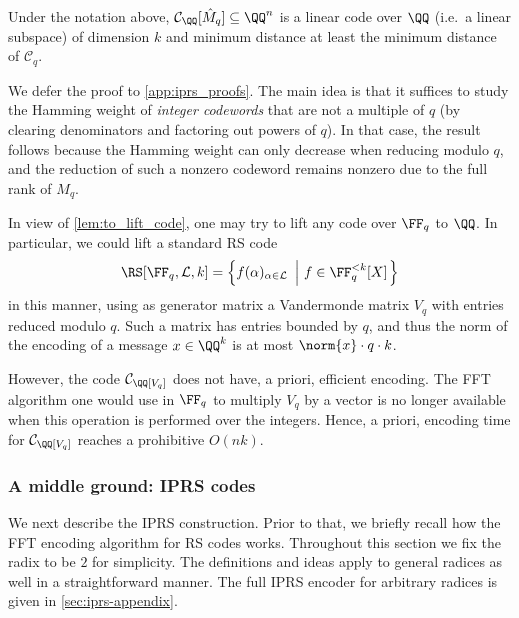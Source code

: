 \begin{lemma}\label{lem:to_lift_code}
Under the notation above, $\mathcal{C}_\QQ[\hat{M}_q] \subseteq \QQ^n$ is a linear code over $\QQ$ (i.e.\ a linear subspace) of dimension $k$ and minimum distance at least the minimum distance of $\mathcal{C}_q$. 
\end{lemma}
We defer the proof to \cref{app:iprs_proofs}. The main idea is that it suffices to study the Hamming weight of \emph{integer codewords} that are not a multiple of $q$ (by clearing denominators and factoring out powers of $q$). In that case, the result follows because the Hamming weight can only decrease when reducing modulo $q$, and the reduction of such a nonzero codeword remains nonzero due to the full rank of $M_q$.



In view of \cref{lem:to_lift_code}, one may try to lift any code over $\FF_q$ to $\QQ$. In particular, we could lift a standard RS code \begin{equation*}\RS[\FF_q,\mathcal{L},k]=\left\{f(\alpha)_{\alpha\in \mathcal{L}} \ \left| \ f \in \FF_q^{<k}[X] \right.\right\}\end{equation*} in this manner, using as generator matrix a Vandermonde matrix $V_q$ with entries reduced modulo $q$. Such a matrix has entries bounded by $q$, and thus the norm of the encoding of a message $x\in \QQ^k$ is at most $\norm{x}\cdot q\cdot k$.

However, the code $\mathcal{C}_\QQ[V_q]$ does not have, a priori, efficient encoding. The FFT algorithm one would use in $\FF_q$ to multiply $V_q$ by a vector is no longer available when this operation is performed over the integers. Hence, a priori, encoding time for $\mathcal{C}_\QQ[V_q]$ reaches a prohibitive $O(nk)$.

\subsubsection{A middle ground: IPRS codes}

We next describe the IPRS construction. Prior to that, we briefly recall how the FFT encoding algorithm for RS codes works. Throughout this section we fix the radix to be $2$ for simplicity. The definitions and ideas apply to general radices as well in a straightforward manner. The full IPRS encoder for arbitrary radices is given in \cref{sec:iprs-appendix}.



